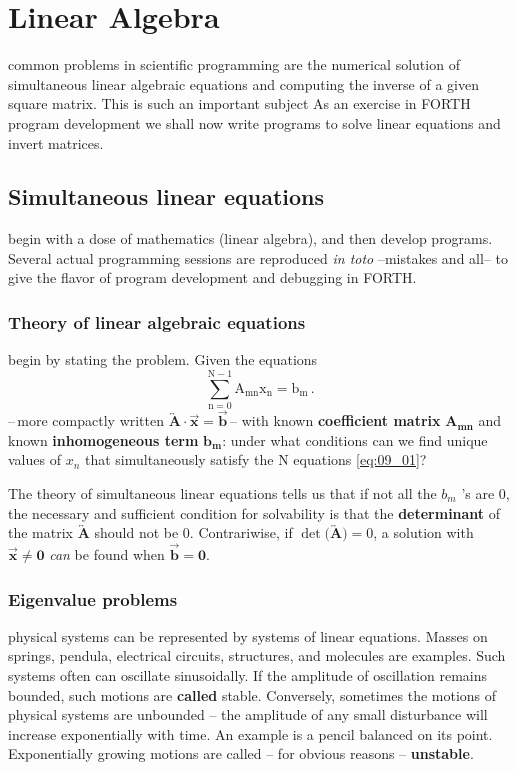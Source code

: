  
\chapter{Linear Algebra}

 common problems in scientific programming are the numerical solution of simultaneous linear algebraic equations and computing the inverse of a given square matrix. This is such an important subject As an exercise in FORTH program development we shall now write programs to solve linear equations and invert matrices.

\section{Simultaneous linear equations}
 begin with a dose of mathematics (linear algebra), and then develop programs. Several actual programming sessions are reproduced \textit{in toto} --mistakes and all-- to give the flavor of program development and debugging in FORTH.

\subsection{Theory of linear algebraic equations}
 begin by stating the problem. Given the equations
\begin{equation}
    \mathrm{\sum_{n=0}^{N-1}A_{mn}x_n=b_m \,.}
    \label{eq:09_01}
\end{equation}
--\,more compactly written $\boldsymbol{\overleftrightarrow{A} \cdot \vec{x} = \vec{b}\,}$-- with known \textbf{coefficient matrix} $\boldsymbol{A_{mn}}$ and known \textbf{inhomogeneous term} $\boldsymbol{b_m}$: under what conditions can we find unique values of $x_n$ that simultaneously satisfy the N equations \ref{eq:09_01}?

The theory of simultaneous linear equations tells us that if not all the $b_m$ 's are 0, the necessary and sufficient condition for solvability is that the \textbf{determinant} of the matrix $\boldsymbol{\overleftrightarrow{A}}$ should not be 0. Contrariwise, if $\det($$\boldsymbol{\overleftrightarrow{A}}$$ )= 0$, a solution with $\boldsymbol{\vec{x} \neq 0 }$ \textit{can} be found when $\boldsymbol{\vec{b}= 0}$.

\subsection{Eigenvalue problems} 
 physical systems can be represented by systems of linear equations. Masses on springs, pendula, electrical circuits, structures, and molecules are examples. Such systems often can oscillate sinusoidally. If the amplitude of oscillation remains bounded, such motions are \textbf{called} stable. Conversely, sometimes the motions of physical systems are unbounded -- the amplitude of any small disturbance will increase exponentially with time. An example is a pencil balanced on its point. Exponentially growing motions are called -- for obvious reasons -- \textbf{unstable}.

